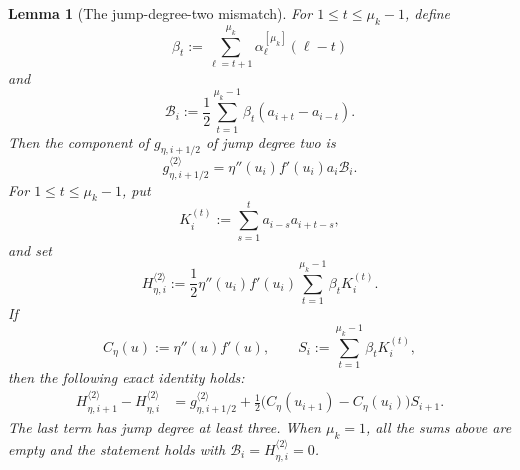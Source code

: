 \documentclass[11pt]{amsart}
\theoremstyle{plain}
\newtheorem{lemma}[theorem]{Lemma}
\theoremstyle{definition}
\theoremstyle{remark}
\numberwithin{equation}{section}
\theoremstyle{plain}
\begin{document}
\begin{lemma}[The jump-degree-two mismatch]
	\label{lem:quadratic-mismatch}
	For $1\le t\le\mu_k-1$, define
	\begin{equation}\label{eq:beta-definition}
		\beta_t
		:=\sum_{\ell=t+1}^{\mu_k}
		\alpha_\ell^{[\mu_k]}(\ell-t)
	\end{equation}
	and
	\begin{equation}\label{eq:quadratic-Bi-profile}
		\mathcal B_i
		:=\frac12\sum_{t=1}^{\mu_k-1}
		\beta_t(a_{i+t}-a_{i-t}).
	\end{equation}
	Then the component of $g_{\eta,i+1/2}$ of jump degree two is
	\begin{equation}\label{eq:quadratic-mismatch-term}
		g_{\eta,i+1/2}^{\langle2\rangle}
		=\eta''(u_i)f'(u_i)a_i\mathcal B_i.
	\end{equation}
	For $1\le t\le\mu_k-1$, put
	\begin{equation}\label{eq:K-definition}
		K_i^{(t)}
		:=\sum_{s=1}^{t}a_{i-s}a_{i+t-s},
	\end{equation}
	and set
	\begin{equation}\label{eq:quadratic-primitive}
		H_{\eta,i}^{\langle2\rangle}
		:=\frac12\eta''(u_i)f'(u_i)
		\sum_{t=1}^{\mu_k-1}\beta_tK_i^{(t)}.
	\end{equation}
	If
	\[
	C_\eta(u):=\eta''(u)f'(u),
	\qquad
	S_i:=\sum_{t=1}^{\mu_k-1}\beta_tK_i^{(t)},
	\]
	then the following exact identity holds:
	\begin{align}
		H_{\eta,i+1}^{\langle2\rangle}
		-H_{\eta,i}^{\langle2\rangle}
		&={}
		g_{\eta,i+1/2}^{\langle2\rangle}
		+\frac12
		\bigl(C_\eta(u_{i+1})-C_\eta(u_i)\bigr)S_{i+1}.
		\label{eq:quadratic-coboundary-exact-remainder}
	\end{align}
	The last term has jump degree at least three.  When $\mu_k=1$, all the
	sums above are empty and the statement holds with
		$\mathcal B_i=H_{\eta,i}^{\langle2\rangle}=0$.
\end{lemma}
\end{document}
